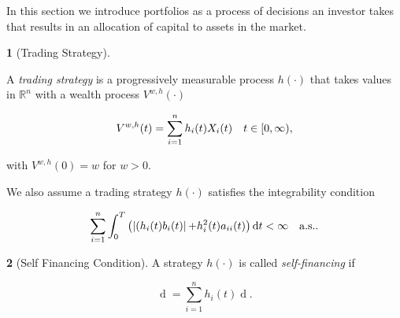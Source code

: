 \documentclass[british]{amsart} \usepackage{lmodern}
\numberwithin{equation}{section} \numberwithin{figure}{section}
\theoremstyle{plain} \newtheorem{thm}{\protect\theoremname}[section]
\theoremstyle{definition} \newtheorem{defn}[thm]{\protect\definitionname}
\theoremstyle{plain} \newtheorem{assumption}[thm]{\protect\assumptionname}
\theoremstyle{plain} \newtheorem{lem}[thm]{\protect\lemmaname}
\theoremstyle{plain} \newtheorem{prop}[thm]{\protect\propositionname}
\theoremstyle{remark} \newtheorem{rem}[thm]{\protect\remarkname}
\theoremstyle{plain} \newtheorem{cor}[thm]{\protect\corollaryname}
\renewcommand{\d}[1]{\mathop{\mathrm{d}{#1}}}
\newcommand{\abs}[1]{\mathop{|{#1}|}} \newcommand{\market}{\mathcal{M}}
\begin{document}
In this section we introduce portfolios as a process of decisions an investor
takes that results in an allocation of capital to assets in the market.

\begin{defn} [Trading Strategy]
  \label{def:tradingstrategy}

  A \textit{trading strategy} is a progressively measurable process $h(\cdot)$
  that takes values in $\mathbb{R}^{n}$ with a wealth process $V^{w,h}(\cdot)$ 

  \begin{equation*}
    V^{w,h}(t) = \sum_{i=1}^{n} h_{i}(t) X_{i}(t) 
    \quad t\in[0,\infty),
  \end{equation*}

  with $V^{w,h}(0)=w$ for $w > 0$. 

  We also assume a trading strategy $h(\cdot)$ satisfies the integrability condition

  \begin{equation*}
    \sum_{i=1}^{n} \int_{0}^{T} 
    \left(
    \abs{(h_{i}(t)b_{i}(t)} + h_{i}^2(t)a_{ii}(t)
      \right) \d{t} < \infty
    \quad \almostsurely.
  \end{equation*}

\end{defn}

\begin{defn} [Self Financing Condition]
  \label{def:selffinancingcondition}  
  A strategy $h(\cdot)$ is called \textit{self-financing} if 

  \begin{equation}
    \d{V^{w,h}(t)} = \sum_{i=1}^{n} h_{i}(t) \d{X_{i}(t)}.
  \end{equation}


\end{defn}
\end{document}
